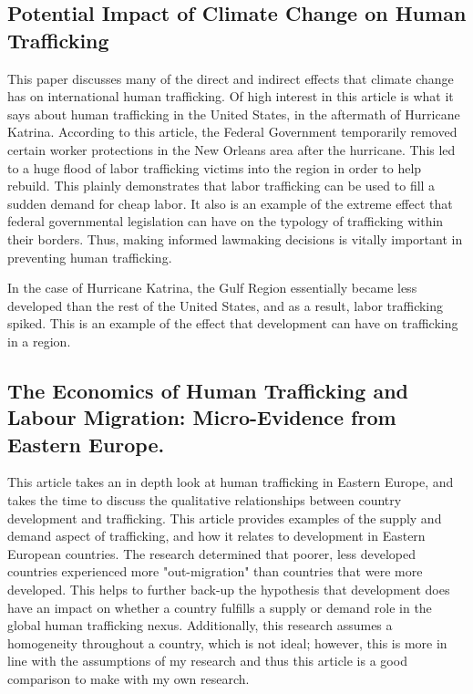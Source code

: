 \documentclass{article} %
\begin{document}
\subsection*{Potential Impact of Climate Change on Human Trafficking}

This paper discusses many of the direct and indirect effects that climate change has on international human trafficking. Of high interest in this article is what it says about human trafficking in the United States, in the aftermath of Hurricane Katrina. According to this article, the Federal Government temporarily removed certain worker protections in the New Orleans area after the hurricane. This led to a huge flood of labor trafficking victims into the region in order to help rebuild. This plainly demonstrates that labor trafficking can be used to fill a sudden demand for cheap labor. It also is an example of the extreme effect that federal governmental legislation can have on the typology of trafficking within their borders. Thus, making informed lawmaking decisions is vitally important in preventing human trafficking.

In the case of Hurricane Katrina, the Gulf Region essentially became less developed than the rest of the United States, and as a result, labor trafficking spiked. This is an example of the effect that development can have on trafficking in a region.
\nocite{Climate}

\subsection*{The Economics of Human Trafficking and Labour Migration: Micro-Evidence from Eastern Europe.}

This article takes an in depth look at human trafficking in Eastern Europe, and takes the time to discuss the qualitative relationships between country development and trafficking. This article provides examples of the supply and demand aspect of trafficking, and how it relates to development in Eastern European countries. The research determined that poorer, less developed countries experienced more "out-migration" than countries that were more developed. This helps to further back-up the hypothesis that development does have an impact on whether a country fulfills a supply or demand role in the global human trafficking nexus. Additionally, this research assumes a homogeneity throughout a country, which is not ideal; however, this is more in line with the assumptions of my research and thus this article is a good comparison to make with my own research.
\nocite{EastEurope}
\end{document}
